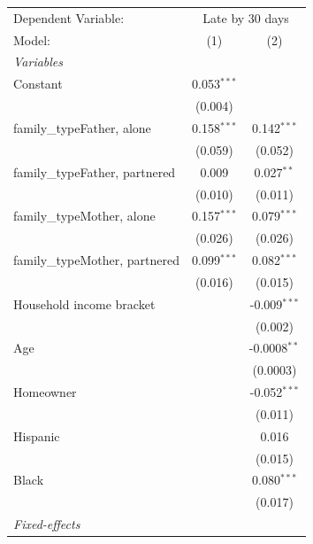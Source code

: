 
\begingroup
\centering
\begin{tabular}{lcc}
   \tabularnewline \midrule \midrule
   Dependent Variable: & \multicolumn{2}{c}{Late by 30 days}\\
   Model:                         & (1)           & (2)\\  
   \midrule
   \emph{Variables}\\
   Constant                       & 0.053$^{***}$ &   \\   
                                  & (0.004)       &   \\   
   family\_typeFather, alone      & 0.158$^{***}$ & 0.142$^{***}$\\   
                                  & (0.059)       & (0.052)\\   
   family\_typeFather, partnered  & 0.009         & 0.027$^{**}$\\   
                                  & (0.010)       & (0.011)\\   
   family\_typeMother, alone      & 0.157$^{***}$ & 0.079$^{***}$\\   
                                  & (0.026)       & (0.026)\\   
   family\_typeMother, partnered  & 0.099$^{***}$ & 0.082$^{***}$\\   
                                  & (0.016)       & (0.015)\\   
   Household income bracket       &               & -0.009$^{***}$\\   
                                  &               & (0.002)\\   
   Age                            &               & -0.0008$^{**}$\\   
                                  &               & (0.0003)\\   
   Homeowner                      &               & -0.052$^{***}$\\   
                                  &               & (0.011)\\   
   Hispanic                       &               & 0.016\\   
                                  &               & (0.015)\\   
   Black                          &               & 0.080$^{***}$\\   
                                  &               & (0.017)\\   
   \midrule
   \emph{Fixed-effects}\\

\end{tabular}
